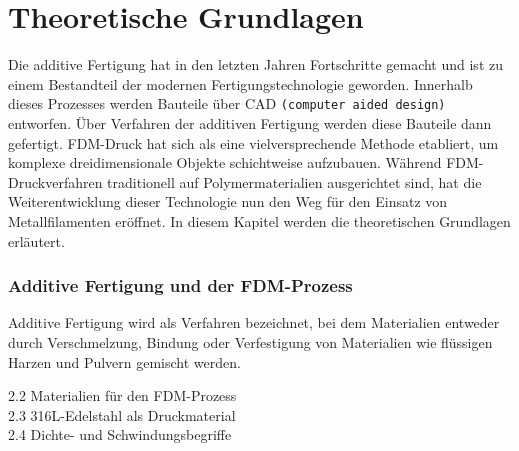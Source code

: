 \chapter{Theoretische Grundlagen}

Die additive Fertigung hat in den letzten Jahren Fortschritte gemacht und ist zu einem Bestandteil der modernen Fertigungstechnologie geworden. Innerhalb dieses Prozesses werden Bauteile über CAD \texttt{(computer aided design)} entworfen. Über Verfahren der additiven Fertigung werden diese Bauteile dann gefertigt. FDM-Druck hat sich als eine vielversprechende Methode etabliert, um komplexe dreidimensionale Objekte schichtweise aufzubauen. Während FDM-Druckverfahren traditionell auf Polymermaterialien ausgerichtet sind, hat die Weiterentwicklung dieser Technologie nun den Weg für den Einsatz von Metallfilamenten eröffnet. In diesem Kapitel werden die theoretischen Grundlagen erläutert.

\subsection{Additive Fertigung und der FDM-Prozess}

Additive Fertigung wird als Verfahren bezeichnet, bei dem Materialien entweder durch Verschmelzung, Bindung oder Verfestigung von Materialien wie flüssigen Harzen und Pulvern gemischt werden. 

\autocite{Osama2019}

2.2 Materialien für den FDM-Prozess\\
2.3 316L-Edelstahl als Druckmaterial\\
2.4 Dichte- und Schwindungsbegriffe\\